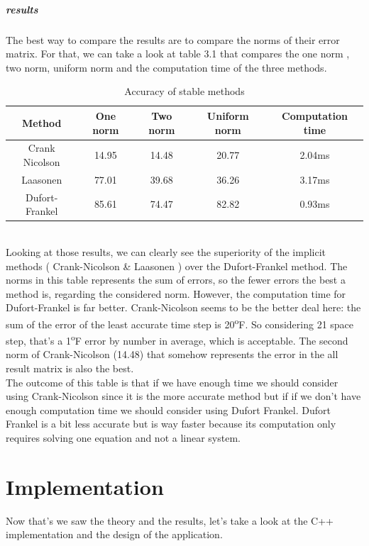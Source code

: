 \documentclass[12pt, a4paper]{report}
\begin{document}
\paragraph{results}
The best way to compare the results are to compare the norms of their error matrix. For that, we can take a look at table 3.1 that compares the one norm , two norm, uniform norm and the computation time of the three methods.\\
\begin{table}[ht]
\centering
\begin{tabular}{c c c c c}
\toprule
Method & One norm & Two norm & Uniform norm & Computation time \\
\midrule
Crank Nicolson & 14.95 & 14.48 & 20.77 & 2.04ms\\
Laasonen &77.01&39.68&36.26&3.17ms\\
Dufort-Frankel & 85.61 & 74.47 & 82.82 & 0.93ms\\
\end{tabular}
\caption{Accuracy of stable methods}
\end{table}\\
Looking at those results, we can clearly see the superiority of the implicit methods ( Crank-Nicolson \& Laasonen ) over the Dufort-Frankel method. The norms in this table represents the sum of errors, so the fewer errors the best a method is, regarding the considered norm. However, the computation time for Dufort-Frankel is far better. Crank-Nicolson seems to be the better deal here: the sum of the error of the least accurate time step is 20\textsuperscript{o}F. So considering 21 space step, that's a 1\textsuperscript{o}F error by number in average, which is acceptable. The second norm of Crank-Nicolson (14.48) that somehow represents the error in the all result matrix is also the best.\\
The outcome of this table is that if we have enough time we should consider using Crank-Nicolson since it is the more accurate method but if if we don't have enough computation time we should consider using Dufort Frankel. Dufort Frankel is a bit less accurate but is way faster because its computation only requires solving one equation and not a linear system.

\chapter{Implementation}
Now that's we saw the theory and the results, let's take a look at the C++ implementation and the design of the application.
\end{document}
